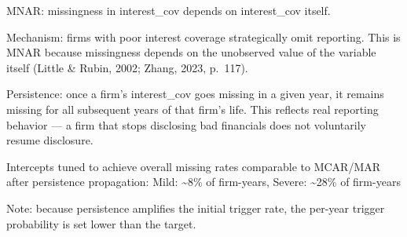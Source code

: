 \documentclass[
]{article}
\begin{document}
MNAR: missingness in interest\_cov depends on interest\_cov itself.

Mechanism: firms with poor interest coverage strategically omit
reporting. This is MNAR because missingness depends on the unobserved
value of the variable itself (Little \& Rubin, 2002; Zhang, 2023,
p.~117).

Persistence: once a firm's interest\_cov goes missing in a given year,
it remains missing for all subsequent years of that firm's life. This
reflects real reporting behavior --- a firm that stops disclosing bad
financials does not voluntarily resume disclosure.

Intercepts tuned to achieve overall missing rates comparable to MCAR/MAR
after persistence propagation: Mild: \textasciitilde8\% of firm-years,
Severe: \textasciitilde28\% of firm-years

Note: because persistence amplifies the initial trigger rate, the
per-year trigger probability is set lower than the target.
\end{document}
